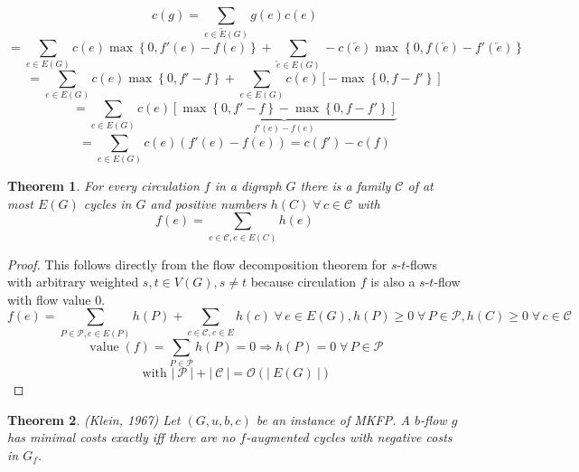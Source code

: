 \documentclass{article}
\newtheorem{theorem}{Theorem}
\newcommand{\card}[1]{\left|\:\!#1\:\!\right|}
\newcommand{\set}[1]{\left\{#1\right\}}
\newcommand{\flow}[2]{$#1$-$#2$-flow}
\newcommand{\fall}{\;\forall\,}
\begin{document}
\begin{equation*}
  c(g) = \sum_{e \in \overleftrightarrow{E}(G)} g(e) c(e)
\end{equation*} \begin{equation*}
    = \sum_{e \in E(G)} c(e) \max\set{0, f'(e) - f(e)} + \sum_{\overleftarrow{e} \in E(G)} -c(\overleftarrow{e}) \max\set{0, f(\overleftarrow{e}) - f'(\overleftarrow{e})}
\end{equation*} \begin{equation*}
    = \sum_{e \in E(G)} c(e) \max\set{0, f' - f} + \sum_{e \in E(G)} c(e) [-\max\set{0, f - f'}]
\end{equation*} \begin{equation*}
    = \sum_{e \in E(G)} c(e) \underbrace{
      \left[\max\set{0, f'-f} - \max\set{0, f - f'} \right]
    }_{f'(e) - f(e)}
\end{equation*} \begin{equation*}
    = \sum_{e \in E(G)} c(e) \left(f'(e) - f(e)\right) = c(f') - c(f)
\end{equation*}

\begin{theorem}\label{proposition-5.2}
  For every circulation $f$ in a digraph $G$ there is a family $\mathcal{C}$ of at most $E(G)$ cycles in $G$ and positive numbers $h(C) \fall c \in \mathcal{C}$ with
  \[
    f(e) = \sum_{c \in \mathcal{C}, e \in E(C)} h(e)
  \]
\end{theorem}

\begin{proof}
  This follows directly from the flow decomposition theorem for \flow sts with arbitrary weighted $s,t \in V(G), s \neq t$ because circulation $f$ is also a \flow st with flow value $0$.
  \[
    f(e) = \sum_{P \in \mathcal{P}, e \in E(P)} h(P) + \sum_{c \in \mathcal{C}, e \in E} h(c)
      \fall e \in E(G), h(P) \geq 0 \fall P \in \mathcal{P}, h(C) \geq 0 \fall c \in \mathcal{C}
  \] \[
    \operatorname{value}(f) = \sum_{P \in \mathcal{P}} h(P) = 0 \Rightarrow h(P) = 0 \fall P \in \mathcal{P}
  \] \[
    \text{ with } \card{\mathcal{P}} + \card{\mathcal{C}} = \mathcal{O}(\card{E(G)})
  \]
\end{proof}

\begin{theorem}\label{satz-5.3}
  (Klein, 1967)
  Let $(G, u, b, c)$ be an instance of MKFP. A $b$-flow $g$ has minimal costs exactly iff there are no $f$-augmented cycles with negative costs in $G_f$.
\end{theorem}
\end{document}
